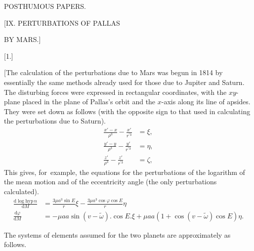 \clearpage
\begingroup
{}
\renewcommand{\headrulewidth}{0pt}
\clearpage
{}
\begin{center}
\large POSTHUMOUS PAPERS.
\par\bigskip
\Large [IX. PERTURBATIONS OF PALLAS\par BY MARS.]
\par\bigskip
\normalsize [1.]
\end{center}
\begingroup
\small
\makeatletter\tagsleft@true\let\veqno\@@leqno\makeatother
\par\noindent\hspace*{\parindent}[The calculation of the perturbations due to Mars was begun in 1814 by essentially the same methods
already used for those due to Jupiter and Saturn. The disturbing forces
were expressed in rectangular coordinates, with the \(xy\)-plane placed in the plane of Pallas’s orbit and the
\(x\)-axis along its line of apsides. They were set down as follows (with the opposite sign
to that used in calculating the perturbations due to Saturn).
\[
\tag*{1)}
\begin{aligned}
\frac{x'-x}{\rho^3}-\frac{x'}{r^{\prime3}}&=\xi,\\[.6em]
\frac{y'-y}{\rho^3}-\frac{y'}{r^{\prime3}}&=\eta,\\[.6em]
\frac{z'}{\rho^3}-\frac{z'}{r^{\prime3}}&=\zeta,
\end{aligned}
\]
This gives, for\ example, the equations for the perturbations of the logarithm of the mean motion and of the eccentricity angle
(the only perturbations calculated).
\[
\tag*{2)}
\begin{aligned}
\frac{\mathrm{d}\log\mathrm{hyp}\,n}{\mathrm{d}M}
&=\frac{3\mu a^3\sin E}{r}\xi-\frac{3\mu a^3\cos\varphi\cos E}{r}\eta\\[.6em]
\frac{\mathrm{d}\varphi}{\mathrm{d}M}
&=-\mu aa\sin(v-\tilde\omega)\mathord{.}\cos E\mathord{.}\xi
  +\mu aa(1+\cos(v-\tilde\omega)\cos E)\eta.
\end{aligned}
\]
\par\noindent\hspace*{\parindent}The systems of elements assumed for the two planets are approximately as follows.
